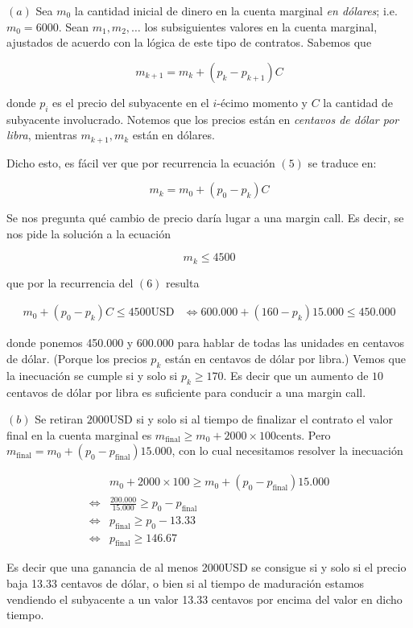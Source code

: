 \documentclass[a4paper, 12pt]{article}
\theoremstyle{definition}
\begin{document}
$(a)$ Sea $m_0$ la cantidad inicial de dinero en la cuenta marginal \textit{en
dólares}; i.e. $m_0 = 6000$. Sean $m_1, m_2, \ldots$ los subsiguientes valores
en la cuenta marginal, ajustados de acuerdo con la lógica de este tipo de
contratos. Sabemos que 

\begin{equation}
    m_{k+1} = m_k + (p_{k} - p_{k+1}) C
\end{equation}

donde $p_i$ es el precio del subyacente en el $i$-écimo momento y $C$ la
cantidad de subyacente involucrado. Notemos que los precios están en
\textit{centavos de dólar por libra}, mientras $m_{k+1}, m_k$ están en dólares.

Dicho esto, es fácil ver que por recurrencia la ecuación $(5)$ se traduce en: 

\begin{equation}
    m_{k} = m_0 + (p_0 - p_k)C
\end{equation}

Se nos pregunta qué cambio de precio daría lugar a una margin call. Es decir, se
nos pide la solución a la ecuación 

\begin{equation*}
    m_k \leq 4500
\end{equation*}

que por la recurrencia del $(6)$ resulta 

\begin{align*}
    m_0 + (p_0 - p_k)C \leq 4500\text{USD}
    &\iff 600.000 + (160 - p_k)15.000 \leq 450.000
\end{align*}

donde ponemos 450.000 y 600.000 para hablar de todas las unidades en centavos de
dólar. (Porque los precios $p_k$ están en centavos de dólar por libra.) Vemos
que la inecuación se cumple si y solo si $p_k \geq 170$. Es decir que un aumento
de $10$ centavos de dólar por libra es suficiente para conducir a una margin
call. 

$(b)$ Se retiran $2000$USD si y solo si al tiempo de finalizar el contrato el
valor final en la cuenta marginal es $m_{\text{final}} \geq m_0 + 2000 \times 100
\text{cents}$.  Pero $m_{\text{final}} = m_0 + (p_{0} -
p_{\text{final}})15.000$, con lo cual necesitamos resolver la inecuación 

\begin{align*}
&m_0 + 2000 \times 100 \geq m_0 + (p_0 - p_{\text{final}})15.000 \\ 
    \iff &\frac{ 200.000 }{15.000} \geq p_0 - p_{\text{final}} \\ 
    \iff& p_{\text{final}} \geq p_0 - 13.33 \\ 
    \iff&p_{\text{final}} \geq 146.67
\end{align*}

Es decir que una ganancia de al menos 2000USD se consigue si y solo si el precio
baja 13.33 centavos de dólar, o bien si al tiempo de maduración estamos vendiendo
el subyacente a un valor 13.33 centavos por encima del valor en dicho tiempo.
\end{document}
